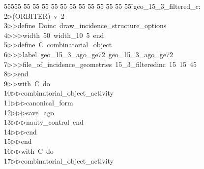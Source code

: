 %
%
\begin{tabbing}
55555 \= 55 \= 55 \= 55 \= 55 \= 55 \= 55 \= 55 \= 55 \= 55 \= 55 \= 55 \= 55 \= \>geo\_15\_3\_filtered\_c:\\[0pt]
2\>$\triangleright$\>(ORBITER)\ v\ 2\ \\[0pt]
3\>$\triangleright$\>$\triangleright$\>define\ Doinc\ draw\_incidence\_structure\_options\ \\[0pt]
4\>$\triangleright$\>$\triangleright$\>$\triangleright$\>width\ 50\ width\_10\ 5\ end\ \\[0pt]
5\>$\triangleright$\>$\triangleright$\>define\ C\ combinatorial\_object\ \\[0pt]
6\>$\triangleright$\>$\triangleright$\>$\triangleright$\>label\ geo\_15\_3\_ago\_ge72\ geo\_15\_3\_ago\_ge72\ \\[0pt]
7\>$\triangleright$\>$\triangleright$\>$\triangleright$\>file\_of\_incidence\_geometries\ 15\_3\_filteredinc\ 15\ 15\ 45\ \\[0pt]
8\>$\triangleright$\>$\triangleright$\>end\ \\[0pt]
9\>$\triangleright$\>$\triangleright$\>with\ C\ do\ \\[0pt]
10\>$\triangleright$\>$\triangleright$\>combinatorial\_object\_activity\ \\[0pt]
11\>$\triangleright$\>$\triangleright$\>$\triangleright$\>canonical\_form\ \\[0pt]
12\>$\triangleright$\>$\triangleright$\>$\triangleright$\>save\_ago\ \\[0pt]
13\>$\triangleright$\>$\triangleright$\>$\triangleright$\>nauty\_control\ end\ \\[0pt]
14\>$\triangleright$\>$\triangleright$\>$\triangleright$\>end\ \\[0pt]
15\>$\triangleright$\>$\triangleright$\>end\ \\[0pt]
16\>$\triangleright$\>$\triangleright$\>with\ C\ do\ \\[0pt]
17\>$\triangleright$\>$\triangleright$\>combinatorial\_object\_activity\ \\[0pt]

\end{tabbing}
